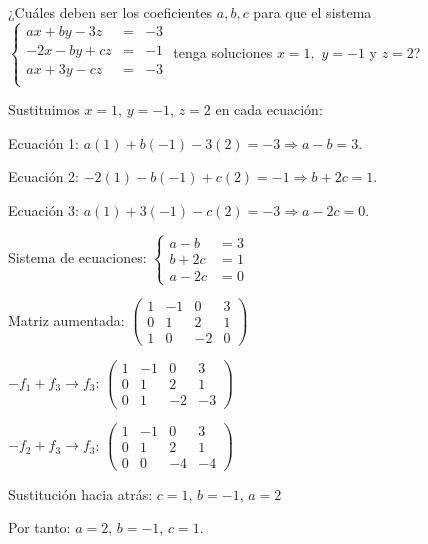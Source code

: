 \begin{prob}
¿Cuáles deben ser los coeficientes $a,b,c$ para que el sistema  $\left\lbrace \begin{array}{ccc}
ax+by-3z&=&-3\\
-2x-by+cz&=&-1\\
ax+3y-cz&=&-3\\
\end{array} \right. $ tenga soluciones $x=1,$ $y=-1$ y $z=2$?


\end{prob}

\begin{myproof}
Sustituimos $x=1$, $y=-1$, $z=2$ en cada ecuación:

Ecuación 1: $a(1) + b(-1) - 3(2) = -3\Rightarrow a - b = 3.$

Ecuación 2: $-2(1) - b(-1) + c(2) = -1\Rightarrow b + 2c = 1.$

Ecuación 3: $a(1) + 3(-1) - c(2) = -3 \Rightarrow a - 2c = 0.$

Sistema de ecuaciones: $\begin{cases}
a - b &= 3 \\
b + 2c &= 1 \\
a - 2c &= 0 
\end{cases}$

Matriz aumentada: $\left(\begin{array}{ccc|c}
1 & -1 & 0 & 3 \\
0 & 1 & 2 & 1 \\
1 & 0 & -2 & 0
\end{array}\right)$ 

$-f_1 + f_3 \to f_3$: $\left(\begin{array}{ccc|c}
1 & -1 & 0 & 3 \\
0 & 1 & 2 & 1 \\
0 & 1 & -2 & -3
\end{array}\right)$

$-f_2 + f_3 \to f_3$: $\left(\begin{array}{ccc|c}
1 & -1 & 0 & 3 \\
0 & 1 & 2 & 1 \\
0 & 0 & -4 & -4
\end{array}\right)$

Sustitución hacia atrás:
$c = 1$, $b = -1$, $a = 2$

Por tanto: $a = 2$, $b = -1$, $c = 1$.
\end{myproof}

